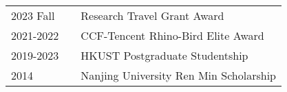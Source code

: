 
\begin{table}[h]
    \begin{tabular}{lcl}
      2023 Fall & \hspace{10pt} & Research Travel Grant Award \\
      2021-2022 & \hspace{10pt} & CCF-Tencent Rhino-Bird Elite Award \\
      2019-2023 & \hspace{10pt} & HKUST Postgraduate Studentship \\
      2014      & \hspace{10pt} & Nanjing University Ren Min Scholarship
    \end{tabular}
\end{table}
